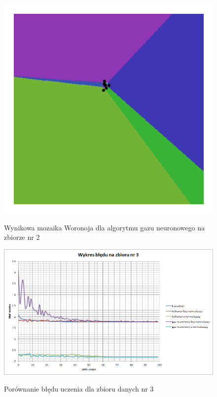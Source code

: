 \documentclass{classrep}
\begin{document}
\begin{figure}[h]
	\centering
		\includegraphics[scale=0.55]{pictures/neuralgas_8_neuronow_zbior_1.png}
	\label{fig:neuralgas_8_neuronow_zbior_1}
	\caption{Wynikowa mozaika Woronoja dla algorytmu gazu neuronowego na zbiorze nr 2}
\end{figure}

\begin{figure}[h]
	\centering
		\includegraphics[scale=0.55]{pictures/183566_3.png}
	\label{fig:183566_3}
	\caption{Porównanie błędu uczenia dla zbioru danych nr 3}
\end{figure}
\end{document}
